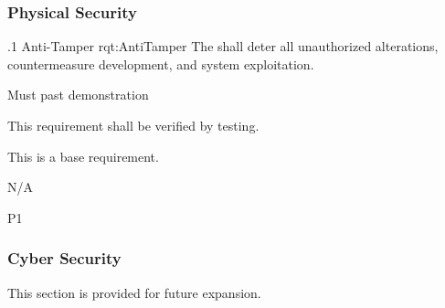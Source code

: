 \subsubsection{Physical Security}
\label{sssec_Physical_Security}


\ONERQMTV
{\RqtNumberBase.1}
{Anti-Tamper}
{rqt:AntiTamper}
{The \ThisSystem shall deter all unauthorized alterations, countermeasure development, and system exploitation.}
{
	\item [Phase 1] Must past demonstration
}
{This requirement shall be verified by testing.}
{
\item [N/A] This is a base requirement.
}
{
	\item N/A
}
{P1}

\subsubsection{Cyber Security}
\label{sssec_Cyber_Security}

This section is provided for future expansion.